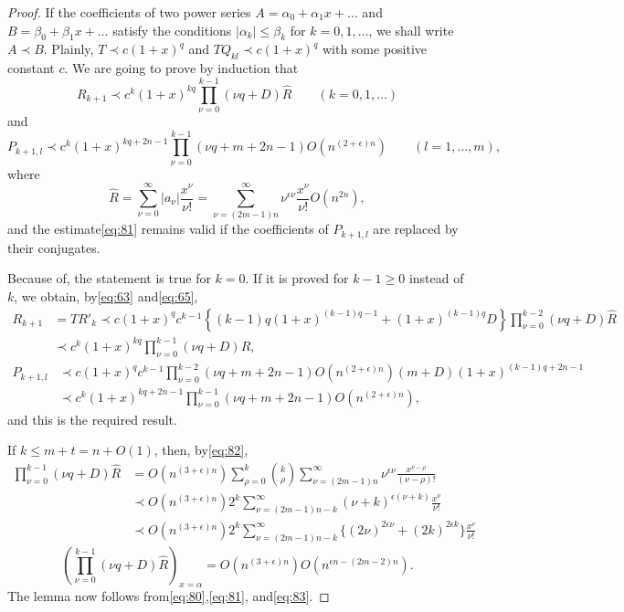 \begin{proof}
If the coefficients of two power series $A=\alpha_0+\alpha_1x+\dots$ and $B=\beta_0+\beta_1x+\dots$ satisfy the conditions $|\alpha_k| \le \beta_k$ for $k=0,1,\dots$, we shall write $A \prec B$. Plainly, $T \prec c(1+x)^q$ and $T Q_{kl} \prec c(1+x)^q$ with some positive constant $c$. We are going to prove by induction that
\begin{equation}
R_{k+1} \prec c^k (1+x)^{kq} \prod_{\nu=0}^{k-1} (\nu q + D) \hat{R} \qquad (k=0,1,\dots) \tag{80}\label{eq:80}
\end{equation}
and
\begin{equation}
P_{k+1,l} \prec c^{k} (1+x)^{kq+2n-1} \prod_{\nu=0}^{k-1} (\nu q + m + 2n-1) O(n^{(2+\epsilon)n}) \qquad (l=1,\dots,m), \tag{81}\label{eq:81}
\end{equation}
where
\begin{equation}
\hat{R} = \sum_{\nu=0}^{\infty} |a_{\nu}| \frac{x^{\nu}}{\nu!} = \sum_{\nu=(2m-1)n}^{\infty} \nu^{\epsilon \nu} \frac{x^{\nu}}{\nu!} O(n^{2n}), \tag{82}\label{eq:82}
\end{equation}
and the estimate\eqref{eq:81} remains valid if the coefficients of $P_{k+1,l}$ are replaced by their conjugates.

Because of, the statement is true for $k=0$. If it is proved for $k-1 \ge 0$ instead of $k$, we obtain, by\eqref{eq:63} and\eqref{eq:65},
\[
\begin{aligned}
R_{k+1} &= T R'_{k} \prec c(1+x)^{q} c^{k-1} \left\{ (k-1)q(1+x)^{(k-1)q-1} + (1+x)^{(k-1)q}D \right\} \prod_{\nu=0}^{k-2} (\nu q+D) \hat{R} \\
&\prec c^{k} (1+x)^{kq} \prod_{\nu=0}^{k-1} (\nu q+D) \hat{R},
\end{aligned}
\]
\[
\begin{aligned}
P_{k+1,l} &\prec c(1+x)^{q} c^{k-1} \prod_{\nu=0}^{k-2} (\nu q + m + 2n - 1) O(n^{(2+\epsilon)n}) (m+D)(1+x)^{(k-1)q+2n-1} \\
&\prec c^k (1+x)^{kq+2n-1} \prod_{\nu=0}^{k-1} (\nu q + m + 2n-1) O(n^{(2+\epsilon)n}),
\end{aligned}
\]
and this is the required result.

If $k \le m+t = n+O(1)$, then, by\eqref{eq:82},
\[
\begin{aligned}
\prod_{\nu=0}^{k-1} (\nu q + D) \hat{R} &= O(n^{(3+\epsilon)n}) \sum_{\rho=0}^{k} \binom{k}{\rho} \sum_{\nu=(2m-1)n}^{\infty} \nu^{\epsilon\nu} \frac{x^{\nu-\rho}}{(\nu-\rho)!} \\
&\prec O(n^{(3+\epsilon)n}) 2^{k} \sum_{\nu=(2m-1)n-k}^{\infty} (\nu+k)^{\epsilon(\nu+k)} \frac{x^{\nu}}{\nu!} \\
&\prec O(n^{(3+\epsilon)n}) 2^{k} \sum_{\nu=(2m-1)n-k}^{\infty} \{(2\nu)^{2\epsilon\nu} + (2k)^{2\epsilon k}\} \frac{x^{\nu}}{\nu!}
\end{aligned}
\]
\begin{equation}
\left( \prod_{\nu=0}^{k-1} (\nu q + D) \hat{R} \right)_{x=\alpha} = O(n^{(3+\epsilon)n}) O(n^{\epsilon n - (2m-2)n}). \tag{83}\label{eq:83}
\end{equation}
The lemma now follows from\eqref{eq:80},\eqref{eq:81}, and\eqref{eq:83}.
\end{proof}

